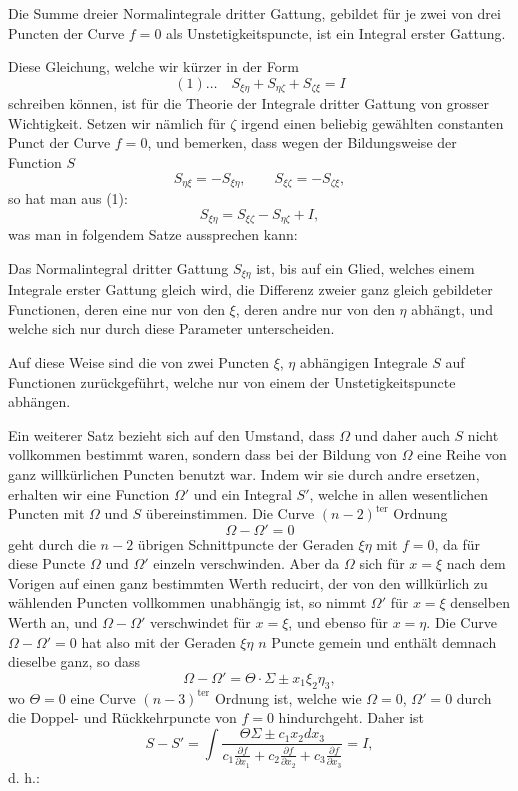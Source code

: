 \documentclass[10pt]{article}
\begin{document}
Die Summe dreier Normalintegrale dritter Gattung, gebildet für je zwei von drei Puncten der Curve $f=0$ als Unstetigkeitspuncte, ist ein Integral erster Gattung.

Diese Gleichung, welche wir kürzer in der Form
\[
(1)\ldots\quad S_{\xi\eta}+S_{\eta\zeta}+S_{\zeta\xi}=I
\]
schreiben können, ist für die Theorie der Integrale dritter Gattung von grosser Wichtigkeit. Setzen wir nämlich für $\zeta$ irgend einen beliebig gewählten constanten Punct der Curve $f=0$, und bemerken, dass wegen der Bildungsweise der Function $S$
\[
S_{\eta\xi}=-S_{\xi\eta},
\qquad
S_{\xi\zeta}=-S_{\zeta\xi},
\]
so hat man aus (1):
\[
S_{\xi\eta}=S_{\xi\zeta}-S_{\eta\zeta}+I,
\]
was man in folgendem Satze aussprechen kann:

Das Normalintegral dritter Gattung $S_{\xi\eta}$ ist, bis auf ein Glied, welches einem Integrale erster Gattung gleich wird, die Differenz zweier ganz gleich gebildeter Functionen, deren eine nur von den $\xi$, deren andre nur von den $\eta$ abhängt, und welche sich nur durch diese Parameter unterscheiden.

Auf diese Weise sind die von zwei Puncten $\xi$, $\eta$ abhängigen Integrale $S$ auf Functionen zurückgeführt, welche nur von einem der Unstetigkeitspuncte abhängen.

Ein weiterer Satz bezieht sich auf den Umstand, dass $\Omega$ und daher auch $S$ nicht vollkommen bestimmt waren, sondern dass bei der Bildung von $\Omega$ eine Reihe von ganz willkürlichen Puncten benutzt war. Indem wir sie durch andre ersetzen, erhalten wir eine Function $\Omega'$ und ein Integral $S'$, welche in allen wesentlichen Puncten mit $\Omega$ und $S$ übereinstimmen. Die Curve $(n-2)^{\mathrm{ter}}$ Ordnung
\[
\Omega-\Omega'=0
\]
geht durch die $n-2$ übrigen Schnittpuncte der Geraden $\xi\eta$ mit $f=0$, da für diese Puncte $\Omega$ und $\Omega'$ einzeln verschwinden. Aber da $\Omega$ sich für $x=\xi$ nach dem Vorigen auf einen ganz bestimmten Werth reducirt, der von den willkürlich zu wählenden Puncten vollkommen unabhängig ist, so nimmt $\Omega'$ für $x=\xi$ denselben Werth an, und $\Omega-\Omega'$ verschwindet für $x=\xi$, und ebenso für $x=\eta$. Die Curve $\Omega-\Omega'=0$ hat also mit der Geraden $\xi\eta$ $n$ Puncte gemein und enthält demnach dieselbe ganz, so dass
\[
\Omega-\Omega'=\Theta\cdot\Sigma\pm x_1\xi_2\eta_3,
\]
wo $\Theta=0$ eine Curve $(n-3)^{\mathrm{ter}}$ Ordnung ist, welche wie $\Omega=0$, $\Omega'=0$ durch die Doppel- und Rückkehrpuncte von $f=0$ hindurchgeht. Daher ist
\[
S-S'=\int\frac{\Theta\Sigma\pm c_1x_2dx_3}{c_1\frac{\partial f}{\partial x_1}+c_2\frac{\partial f}{\partial x_2}+c_3\frac{\partial f}{\partial x_3}}=I,
\]
d. h.:
\end{document}
